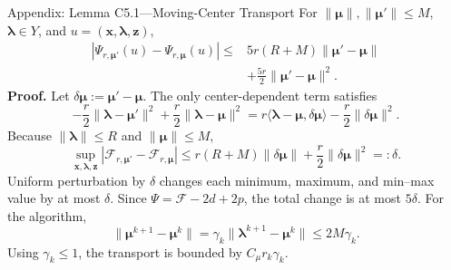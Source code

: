 \documentclass[handout,compress,9pt]{beamer}
\newcommand{\bx}{\bm{x}}
\newcommand{\bz}{\bm{z}}
\newcommand{\bmu}{\bm{\mu}}
\newcommand{\blmbd}{\bm{\lambda}}
\begin{document}
\begin{frame}{Appendix: Lemma C5.1---Moving-Center Transport
\hfill\hyperlink{appendix:contents}{}}
\hypertarget{appendix:candidate-transport}{}
\scriptsize
For $\|\bmu\|,\|\bmu'\|\le M$, $\blmbd\in Y$, and
$u=(\bx,\blmbd,\bz)$,
\begin{equation*}
\begin{aligned}
  |\Psi_{r,\bmu'}(u)-\Psi_{r,\bmu}(u)|
  \le{}&5r(R+M)\|\bmu'-\bmu\|\\
  &+\frac{5r}{2}\|\bmu'-\bmu\|^2.
\end{aligned}
\end{equation*}
\noindent\textbf{Proof.}
Let $\delta\bmu:=\bmu'-\bmu$.  The only center-dependent term satisfies
\begin{equation*}
  -\frac r2\|\blmbd-\bmu'\|^2
  +\frac r2\|\blmbd-\bmu\|^2
  =r\langle\blmbd-\bmu,\delta\bmu\rangle
  -\frac r2\|\delta\bmu\|^2.
\end{equation*}
Because $\|\blmbd\|\le R$ and $\|\bmu\|\le M$,
\begin{equation*}
  \sup_{\bx,\blmbd,\bz}
  |\mathcal F_{r,\bmu'}-\mathcal F_{r,\bmu}|
  \le r(R+M)\|\delta\bmu\|+\frac r2\|\delta\bmu\|^2=:\delta.
\end{equation*}
Uniform perturbation by $\delta$ changes each minimum, maximum, and min--max
value by at most $\delta$.  Since
$\Psi=\mathcal F-2d+2p$, the total change is at most $5\delta$.
For the algorithm,
\begin{equation*}
  \|\bmu^{k+1}-\bmu^k\|
  =\gamma_k\|\blmbd^{k+1}-\bmu^k\|
  \le2M\gamma_k.
\end{equation*}
Using $\gamma_k\le1$, the transport is bounded by $C_\mu r_k\gamma_k$.
\end{frame}
\end{document}
